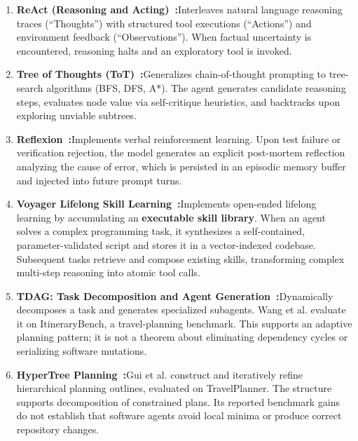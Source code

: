 \documentclass[11pt,a4paper]{article}
\begin{document}
\begin{enumerate}[leftmargin=1.8em,itemsep=3pt]
  \item \textbf{ReAct (Reasoning and Acting)~:}\enspace Interleaves natural language reasoning traces (``Thoughts'') with structured tool executions (``Actions'') and environment feedback (``Observations''). When factual uncertainty is encountered, reasoning halts and an exploratory tool is invoked.
  
  \item \textbf{Tree of Thoughts (ToT)~:}\enspace Generalizes chain-of-thought prompting to tree-search algorithms (BFS, DFS, A*). The agent generates candidate reasoning steps, evaluates node value via self-critique heuristics, and backtracks upon exploring unviable subtrees.
  
  \item \textbf{Reflexion~:}\enspace Implements verbal reinforcement learning. Upon test failure or verification rejection, the model generates an explicit post-mortem reflection analyzing the cause of error, which is persisted in an episodic memory buffer and injected into future prompt turns.

  \item \textbf{Voyager Lifelong Skill Learning~:}\enspace Implements open-ended lifelong learning by accumulating an \textbf{executable skill library}. When an agent solves a complex programming task, it synthesizes a self-contained, parameter-validated script and stores it in a vector-indexed codebase. Subsequent tasks retrieve and compose existing skills, transforming complex multi-step reasoning into atomic tool calls.

  \item \textbf{TDAG: Task Decomposition and Agent Generation~:}\enspace Dynamically decomposes a task and generates specialized subagents. Wang et al. evaluate it on ItineraryBench, a travel-planning benchmark. This supports an adaptive planning pattern; it is not a theorem about eliminating dependency cycles or serializing software mutations.

  \item \textbf{HyperTree Planning~:}\enspace Gui et al. construct and iteratively refine hierarchical planning outlines, evaluated on TravelPlanner. The structure supports decomposition of constrained plans. Its reported benchmark gains do not establish that software agents avoid local minima or produce correct repository changes.
\end{enumerate}
\end{document}
